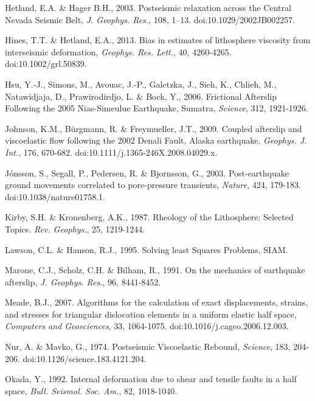 \documentclass[extra,mreferee]{gji}
\begin{document}
\begin{thebibliography}{}
 Hetland, E.A. \& Hager B.H.,
  2003. Postseismic relaxation across the Central Nevada Seismic Belt,
  \textit{J. Geophys. Res.}, 108,
  1–13. doi:10.1029/2002JB002257.

 Hines, T.T. \&
  Hetland, E.A., 2013. Bias in estimates of lithosphere viscosity from
  interseismic deformation, \textit{Geophys. Res. Lett.}, 40,
  4260-4265. doi:10.1002/grl.50839.

 Hsu, Y.-J., Simons, M., Avouac,
  J.-P., Galetzka, J., Sieh, K., Chlieh, M., Natawidjaja, D.,
  Prawirodirdjo, L. \& Bock, Y., 2006. Frictional Afterslip Following
  the 2005 Nias-Simeulue Earthquake, Sumatra, \textit{Science}, 312,
  1921-1926.


Johnson, K.M.,
  B\"urgmann, R. \& Freymueller, J.T., 2009. Coupled afterslip and
  viscoelastic flow following the 2002 Denali Fault, Alaska
  earthquake. \textit{Geophys. J.  Int.}, 176,
  670-682. doi:10.1111/j.1365-246X.2008.04029.x.

 J\'onsson, S.,
  Segall, P., Pedersen, R. \& Bjornsson, G., 2003. Post-earthquake
  ground movements correlated to pore-pressure transients,
  \textit{Nature}, 424, 179-183. doi:10.1038/nature01758.1.

 Kirby, S.H. \& Kronenberg,
  A.K., 1987. Rheology of the Lithosphere: Selected Topics. \textit{Rev.
  Geophys.}, 25, 1219-1244.

 Lawson, C.L. \&
  Hanson, R.J., 1995. Solving least Squares Problems, SIAM.

 Marone, C.J., Scholz,
  C.H.  \& Bilham, R., 1991. On the mechanics of earthquake
  afterslip, \textit{J. Geophys. Res.}, 96, 8441-8452.

 Meade, B.J., 2007. Algorithms for the
  calculation of exact displacements, strains, and stresses for
  triangular dislocation elements in a uniform elastic half space,
  \textit{Computers and Geosciences}, 33,
  1064-1075. doi:10.1016/j.cageo.2006.12.003.

 Nur, A. \& Mavko, G.,
  1974. Postseismic Viscoelastic Rebound, \textit{Science}, 183,
  204-206. doi:10.1126/science.183.4121.204.

 Okada, Y., 1992. Internal
  deformation due to shear and tensile faults in a half space,
  \textit{Bull. Seismol. Soc.  Am.}, 82, 1018-1040.


\end{thebibliography}
\end{document}
